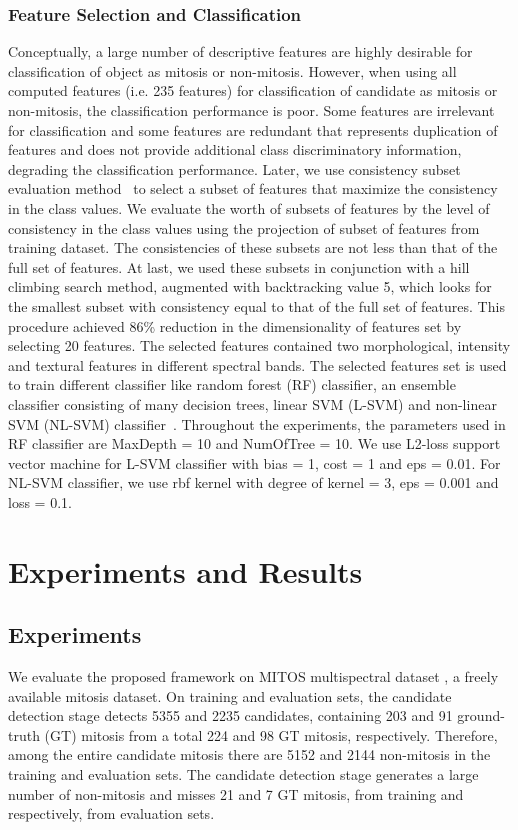 \documentclass[10pt,twocolumn,letterpaper]{article}
\begin{document}
\subsubsection{Feature Selection and Classification}
Conceptually, a large number of descriptive features are highly desirable for classification of object as mitosis or non-mitosis. However, when using all computed features (i.e. 235 features) for classification of candidate as mitosis or non-mitosis, the classification performance is poor. Some features are irrelevant for classification and some features are redundant that represents duplication of features and does not provide additional class discriminatory information, degrading the classification performance. Later, we use consistency subset evaluation method~\cite{liu96} to select a subset of features that maximize the consistency in the class values. We evaluate the worth of subsets of features by the level of consistency in the class values using the projection of subset of features from training dataset. The consistencies of these subsets are not less than that of the full set of features. At last, we used these subsets in conjunction with a hill climbing search method, augmented with backtracking value 5, which looks for the smallest subset with consistency equal to that of the full set of features. This procedure achieved 86\% reduction in the dimensionality of features set by selecting 20 features. The selected features contained two morphological, intensity and textural features in different spectral bands. The selected features set is used to train different classifier like random forest (RF) classifier, an ensemble classifier consisting of many decision trees, linear SVM (L-SVM) and non-linear SVM (NL-SVM) classifier~\cite{weka12}. Throughout the experiments, the parameters used in RF classifier are MaxDepth = 10 and NumOfTree = 10. We use L2-loss support vector machine for L-SVM classifier with bias = 1, cost = 1 and eps = 0.01. For NL-SVM classifier, we use rbf kernel with degree of kernel = 3, eps = 0.001 and loss = 0.1.

\section{Experiments and Results}
\label{sec:results}
\subsection{Experiments}
We evaluate the proposed framework on MITOS multispectral dataset \cite{mITOS2012}, a freely available mitosis dataset. On training and evaluation sets, the candidate detection stage detects 5355 and 2235 candidates, containing 203 and 91 ground-truth (GT) mitosis from a total 224 and 98 GT mitosis, respectively. Therefore, among the entire candidate mitosis there are 5152 and 2144 non-mitosis in the training and evaluation sets. The candidate detection stage generates a large number of non-mitosis and misses 21 and 7 GT mitosis, from training and respectively, from evaluation sets. 
\end{document}
